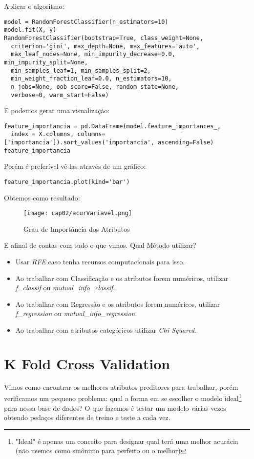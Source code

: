 Aplicar o algoritmo:
\begin{lstlisting}[]
model = RandomForestClassifier(n_estimators=10)
model.fit(X, y)
RandomForestClassifier(bootstrap=True, class_weight=None,
  criterion='gini', max_depth=None, max_features='auto',
  max_leaf_nodes=None, min_impurity_decrease=0.0, min_impurity_split=None,
  min_samples_leaf=1, min_samples_split=2,
  min_weight_fraction_leaf=0.0, n_estimators=10,
  n_jobs=None, oob_score=False, random_state=None,
  verbose=0, warm_start=False)
\end{lstlisting}

E podemos gerar uma visualização:
\begin{lstlisting}[]
feature_importancia = pd.DataFrame(model.feature_importances_,
  index = X.columns, columns=['importancia']).sort_values('importancia', ascending=False)
feature_importancia
\end{lstlisting}

Porém é preferível vê-las através de um gráfico:
\begin{lstlisting}[]
feature_importancia.plot(kind='bar')
\end{lstlisting}

Obtemos como resultado:
\begin{figure}[H]
	\centering
	\texttt{[image: cap02/acurVariavel.png]}
	\caption{Grau de Importância dos Atributos}
\end{figure}

E afinal de contas com tudo o que vimos. Qual Método utilizar?
\begin{itemize}[nolistsep]
	\item Usar \textit{RFE} caso tenha recursos computacionais para isso.
	\item Ao trabalhar com Classificação e os atributos forem numéricos, utilizar \textit{f\_classif} ou \textit{mutual\_info\_classif}.
	\item Ao trabalhar com Regressão e os atributos forem numéricos, utilizar \textit{f\_regression} ou \textit{mutual\_info\_regression}.
	\item Ao trabalhar com atributos categóricos utilizar \textit{Chi Squared}.
\end{itemize}

\section{K Fold Cross Validation}
Vimos como encontrar os melhores atributos preditores para trabalhar, porém verificamos um pequeno problema: qual a forma em se escolher o modelo ideal\footnote{"Ideal" é apenas um conceito para designar qual terá uma melhor acurácia (não usemos como sinônimo para perfeito ou o melhor)} para nossa base de dados? O que fazemos é testar um modelo várias vezes obtendo pedaços diferentes de treino e teste a cada vez.

